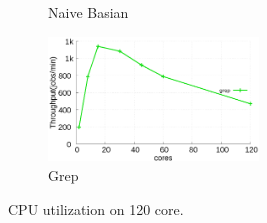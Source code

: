 \begin{figure}[tb]
\begin{subfigure}[b]{0.33\textwidth}
        \caption{Naive Basian}
    \end{subfigure}%
    \begin{subfigure}[b]{0.33\textwidth}
        \includegraphics[width=2.2in]{graph/grep.eps}
        \caption{Grep}
    \end{subfigure}
    
        \centering
    \caption{CPU utilization on 120 core.}
    \label{fig:utilization}
\end{figure}




